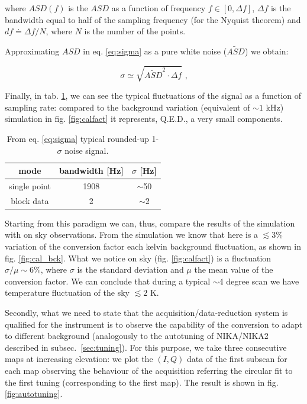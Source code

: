\documentclass[twocolumn,traditabstract]{aa}\\
\begin{document}
\noindent where $ASD(f)$ is the $ASD$ as a function of frequency $f\in[0,\Delta f]$, $\Delta f$ is the bandwidth equal to half of the sampling frequency (for the Nyquist theorem) and $df\doteq\Delta f/N$, where $N$ is the number of the points.

\noindent Approximating $ASD$ in eq. \ref{eq:sigma} as a pure white noise ($\tilde{ASD}$) we obtain:

\begin{equation}
\sigma\simeq \sqrt{ \tilde{ASD}^2 \cdot \Delta f } \text{ ,}
\end{equation}

\noindent Finally, in tab. \ref{tab:sigma_sig}, we can see the typical fluctuations of the signal as a function of sampling rate: compared to the background variation (equivalent of $\sim 1$ kHz) simulation in fig. \ref{fig:calfact} it represents, Q.E.D., a very small components.

\begin{table}[htf]
	\footnotesize
	\centering
	\caption{From eq. \ref{eq:sigma} typical rounded-up 1-$\sigma$ noise signal.}
	\begin{tabular}{ccc}
		\toprule
		\textbf{mode} & \textbf{bandwidth [Hz]} & \textbf{$\sigma$ [Hz]} \\
		\toprule
		single point & 1908 & $\sim$50 \\ 
		\midrule 
		block data & 2 & $\sim$2 \\ 
		\bottomrule
	\end{tabular}
	\label{tab:sigma_sig}
\end{table}

Starting from this paradigm we can, thus, compare the results of the simulation with on sky observations. From the simulation we know that here is a $\lesssim 3\%$ variation of the conversion factor each kelvin background fluctuation, as shown in fig. \ref{fig:cal_bck}. What we notice on sky (fig. \ref{fig:calfact}) is a fluctuation $\sigma/\mu\sim6\%$, where $\sigma$ is the standard deviation and $\mu$ the mean value of the conversion factor. We can conclude that during a typical $\sim$4 degree scan we have temperature fluctuation of the sky $\lesssim 2$ K.

Secondly, what we need to state that the acquisition/data-reduction system is qualified for the instrument is to observe the capability of the conversion to adapt to different background (analogously to the autotuning of NIKA/NIKA2 described in subsec.~\ref{sec:tuning}). For this purpose, we take three consecutive maps at increasing elevation: we plot the $(I,Q)$ data of the first subscan for each map observing the behaviour of the acquisition referring the circular fit to the first tuning (corresponding to the first map). The result is shown in fig. \ref{fig:autotuning}.
\end{document}
